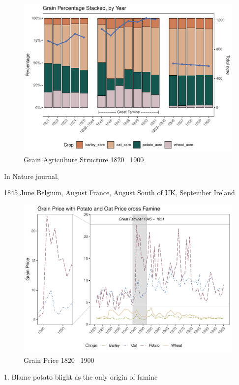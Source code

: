 \begin{figure}[htbp]
    \centering
    \caption{Grain Agriculture Structure 1820 \textendash\ 1900}
    \includegraphics[width=.95\textwidth]{../03_outputs/food_structure.pdf}
\end{figure}

In Nature journal,

1845 June Belgium, August France, August South of UK, September Ireland

\begin{figure}[htbp]
    \centering
    \caption{Grain Price 1820 \textendash\ 1900}
    \includegraphics[width=.95\textwidth]{../03_outputs/grain_price.pdf}
\end{figure}



1. Blame potato blight as the only origin of famine

